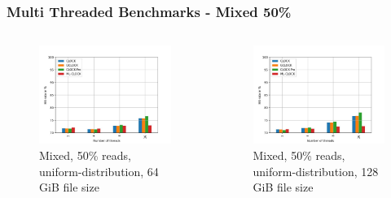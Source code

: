\documentclass[
	aspectratio=169,
	compress,
]{beamer}
\newcommand{\navframetitle}[1]{\frametitle{#1\hfill{\footnotesize\lastsection{}}}}
\begin{document}
\begin{frame}[fragile]
	\navframetitle{Multi Threaded Benchmarks - Mixed 50\%}

	\begin{columns}
		\begin{column}{0.5\textwidth}
			\begin{figure}[ht]
    			\centering
    			\includegraphics[width=\textwidth]{multi_64_gb_rw_50to50_uniform.jpg}
        		\caption{Mixed, 50\% reads, uniform-distribution, 64 GiB file size}
			\end{figure}
		\end{column}
		\begin{column}{0.5\textwidth}
			\begin{figure}[ht]
    			\centering
    			\includegraphics[width=\textwidth]{multi_128_gb_rw_50to50_uniform.jpg}
        		\caption{Mixed, 50\% reads, uniform-distribution, 128 GiB file size}
			\end{figure}			
		\end{column}
	\end{columns}
\end{frame}
\end{document}
